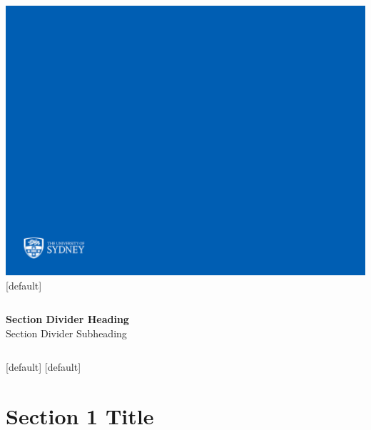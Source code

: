 \documentclass{beamer}
\begin{document}
{\includegraphics[width=\paperwidth,height=\paperheight]{sectiondivstd2jun16.pdf}}
[default]

\begin{frame}
\vspace{1cm}
\begin{columns}
\column{5.5cm}
{\bf{\color{usydwhite}Section Divider Heading}}	\\	%
{\color{usydwhite}Section Divider Subheading}		%

\column{6cm}
\end{columns}
\end{frame}


%
[default]
[default]

\section{Section 1 Title}

\end{document}
